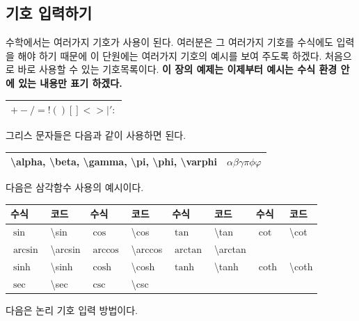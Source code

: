 \documentclass[12pt]{article}
\begin{document}
	\subsection{기호 입력하기}
	수학에서는 여러가지 기호가 사용이 된다. 여러분은 그 여러가지 기호를 수식에도 입력을 해야 하기 때문에 이 단원에는 여러가지 기호의 예시를 보여 주도록 하겠다.\newline\newline
	처음으로 바로 사용할 수 있는 기호목록이다.\newline
	{\bf 이 장의 예제는 이제부터 예시는 수식 환경 안에 있는 내용만 표기 하겠다.}\newline
	
	\begin{tabularx}{\textwidth \onehalfspacing}{|X|}
		\hline
		\(+ - / = ! ( ) [ ] < > | ' :\)\\
		\hline
	\end{tabularx}
	\newline
	\newline
	그리스 문자들은 다음과 같이 사용하면 된다.\newline
	
	\begin{tabularx}{\textwidth \onehalfspacing}{|X|X|}
		\hline
		\textbackslash alpha, \textbackslash beta, \textbackslash gamma, \textbackslash pi, \textbackslash phi, \textbackslash varphi & \(\alpha \beta \gamma \pi \phi \varphi\)\\
		\hline
	\end{tabularx}
	\newline\newline
	다음은 삼각함수 사용의 예시이다.\newline
	
	\begin{tabularx}{\textwidth \onehalfspacing}{|X|X||X|X||X|X||X|X|}
		\hline
		수식&코드&수식&코드&수식&코드&수식&코드\\
		\hline
		\hline
		\(\sin\)&\textbackslash sin &
		\(\cos\)&\textbackslash cos &
		\(\tan\)&\textbackslash tan &
		\(\cot\)&\textbackslash cot \\
		\hline
		\(\arcsin\)&\textbackslash arcsin &
		\(\arccos\)&\textbackslash arccos &
		\(\arctan\)&\textbackslash arctan &
		&\\
		\hline
		\(\sinh\)&\textbackslash sinh &
		\(\cosh\)&\textbackslash cosh &
		\(\tanh\)&\textbackslash tanh &
		\(\coth\)&\textbackslash coth \\
		\hline
		\(\sec\)&\textbackslash sec &
		\(\csc\)&\textbackslash csc &
		 & & & \\
		 \hline
	\end{tabularx}
	\newline
	\newline
	다음은 논리 기호 입력 방법이다.\newline
	
\end{document}
